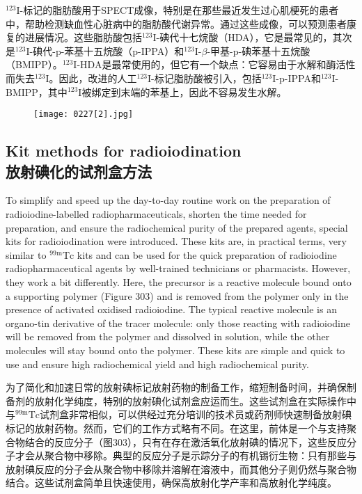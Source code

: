 \documentclass[dvipsnames, svgnames,a4paper,11pt]{article}
\begin{document}
\(\mathrm{^{123}I}\)-标记的脂肪酸用于SPECT成像，特别是在那些最近发生过心肌梗死的患者中，帮助检测缺血性心脏病中的脂肪酸代谢异常。通过这些成像，可以预测患者康复的进展情况。这些脂肪酸包括\(\mathrm{^{123}I}\)-碘代十七烷酸（HDA），它是最常见的，其次是\(\mathrm{^{123}I}\)-碘代-\(\mathrm{p}\)-苯基十五烷酸（p-IPPA）和\(\mathrm{^{123}I}\)-\(\beta\)-甲基-\(\mathrm{p}\)-碘苯基十五烷酸（BMIPP）。\(\mathrm{^{123}I}\)-HDA是最常使用的，但它有一个缺点：它容易由于水解和酶活性而失去\(\mathrm{^{123}I}\)。因此，改进的人工\(\mathrm{^{123}I}\)-标记脂肪酸被引入，包括\(\mathrm{^{123}I}\)-p-IPPA和\(\mathrm{^{123}I}\)-BMIPP，其中\(\mathrm{^{123}I}\)被绑定到末端的苯基上，因此不容易发生水解。

\begin{figure}[h]
	\centering
    \texttt{[image: 0227[2].jpg]}  
     \label{fig302}
\end{figure}


\subsection{Kit methods for radioiodination\\ 放射碘化的试剂盒方法}  
To simplify and speed up the day-to-day routine work on the preparation of radioiodine-labelled radiopharmaceuticals, shorten the time needed for preparation, and ensure the radiochemical purity of the prepared agents, special kits for radioiodination were introduced. These kits are, in practical terms, very similar to \(\mathrm{^{99m}Tc}\) kits and can be used for the quick preparation of radioiodine radiopharmaceutical agents by well-trained technicians or pharmacists. However, they work a bit differently. Here, the precursor is a reactive molecule bound onto a supporting polymer (Figure 303) and is removed from the polymer only in the presence of activated oxidised radioiodine. The typical reactive molecule is an organo-tin derivative of the tracer molecule: only those reacting with radioiodine will be removed from the polymer and dissolved in solution, while the other molecules will stay bound onto the polymer. These kits are simple and quick to use and ensure high radiochemical yield and high radiochemical purity.

为了简化和加速日常的放射碘标记放射药物的制备工作，缩短制备时间，并确保制备剂的放射化学纯度，特别的放射碘化试剂盒应运而生。这些试剂盒在实际操作中与\(\mathrm{^{99m}Tc}\)试剂盒非常相似，可以供经过充分培训的技术员或药剂师快速制备放射碘标记的放射药物。然而，它们的工作方式略有不同。在这里，前体是一个与支持聚合物结合的反应分子（图303），只有在存在激活氧化放射碘的情况下，这些反应分子才会从聚合物中移除。典型的反应分子是示踪分子的有机锡衍生物：只有那些与放射碘反应的分子会从聚合物中移除并溶解在溶液中，而其他分子则仍然与聚合物结合。这些试剂盒简单且快速使用，确保高放射化学产率和高放射化学纯度。
\end{document}
